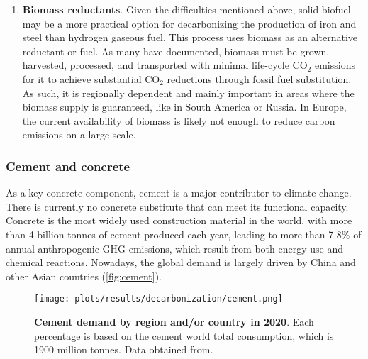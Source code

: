 \begin{enumerate}
\item \textbf{Biomass reductants}. Given the difficulties mentioned above, solid biofuel may be a more practical option for decarbonizing the production of iron and steel than hydrogen gaseous fuel.\autocite{fan2021low} This process uses biomass as an alternative reductant or fuel. As many have documented, biomass must be grown, harvested, processed, and transported with minimal life-cycle CO$_2$ emissions for it to achieve substantial CO$_2$ reductions through fossil fuel substitution.\autocite{langholtz20162016} As such, it is regionally dependent and mainly important in areas where the biomass supply is guaranteed, like in South America or Russia. In Europe, the current availability of biomass is likely not enough to reduce carbon emissions on a large scale.\autocite{hoffmann2021decarbonization}
\end{enumerate}


\subsubsection{Cement and concrete}
\label{sec:cement_and_concrete}

As a key concrete component, cement is a major contributor to climate change. There is currently no concrete substitute that can meet its functional capacity. Concrete is the most widely used construction material in the world, with more than 4 billion tonnes of cement produced each year, leading to more than 7-8\% of annual anthropogenic GHG emissions, which result from both energy use and chemical reactions.\autocite{cement2021concrete} Nowadays, the global demand is largely driven by China and other Asian countries\autocite{iea_2020} (\autoref{fig:cement}).

\begin{figure}[ht!]
  \centering
  \texttt{[image: plots/results/decarbonization/cement.png]}
  \caption[Cement demand by region and/or country in 2020]{\textbf{Cement demand by region and/or country in 2020}. Each percentage is based on the cement world total consumption, which is 1900 million tonnes. Data obtained from.\autocite{iea_2020}}
  \label{fig:cement}
\end{figure}

